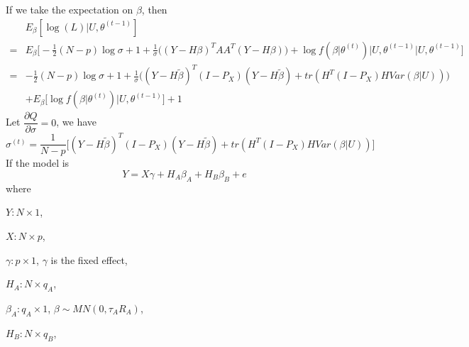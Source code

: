 \documentclass[12pt]{article}
\begin{document}
    If we take the expectation on $\beta$, then
    \begin{align*}
        &E_\beta[\log(L)|U,\theta^{(t-1)}]\\
        =&E_\beta\Big[-\frac{1}{2}(N-p)\log\sigma+1+\frac{1}{\sigma}\Big( (Y-H\beta)^TAA^T(Y-H\beta)     \Big)+\log f(\beta|\theta^{(t)})\Big|U,\theta^{(t-1)}\Big|U,\theta^{(t-1)}\Big]\\
        =&-\frac{1}{2}(N-p)\log\sigma+1+\frac{1}{\sigma}\Big((Y-H\tilde\beta)^T(I-P_X)(Y-H\tilde\beta)+tr(H^T(I-P_X)H Var(\beta|U))\Big)\\
          &+E_\beta\Big[\log f(\beta|\theta^{(t)})\Big|U,\theta^{(t-1)}\Big]+1          
    \end{align*}
    Let $\dfrac{\partial Q}{\partial \sigma}=0$, we have
    \begin{equation}
        \sigma^{(t)}=\frac{1}{N-p}\Big[(Y-H\tilde{\beta})^T(I-P_X)(Y-H\tilde{\beta})+tr(H^T(I-P_X)H Var(\beta|U))         \Big]
    \end{equation}
    If the model is
    \begin{equation*}
        Y=X\gamma+H_A\beta_A+H_B\beta_B+e
    \end{equation*}
    where

    $Y:N\times 1$,

    $X:N\times p$,

    $\gamma:p\times 1$, $\gamma$ is the fixed effect,

    $H_A:N\times q_A$,

    $\beta_A:q_A\times 1$, $\beta\sim MN(0,\tau_A R_A)$,

    $H_B:N\times q_B$,
\end{document}
